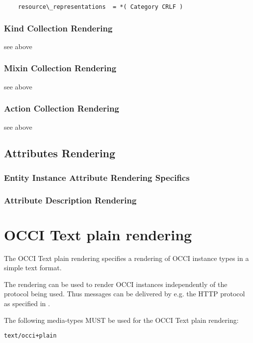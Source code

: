 \documentclass[10pt,a4paper]{article}
\begin{document}
\begin{verbatim}
	resource\_representations  = *( Category CRLF ) 
\end{verbatim}

\subsubsection{Kind Collection Rendering}

see above

\subsubsection{Mixin Collection Rendering}

see above

\subsubsection{Action Collection Rendering}

see above

\subsection{Attributes Rendering}

\subsubsection{Entity Instance Attribute Rendering Specifics}

\subsubsection{Attribute Description Rendering}
\label{sec:format_attribute_description}

\section{OCCI Text plain rendering}
The OCCI Text plain rendering specifies a rendering of OCCI instance types in a simple text format.

The rendering can be used to render OCCI instances independently of the
protocol being used. Thus messages can be delivered by e.g. the HTTP
protocol as specified in \cite{occi:protocol}.

The following media-types MUST be used for the OCCI Text plain rendering:

	{\tt text/occi+plain}
\end{document}
